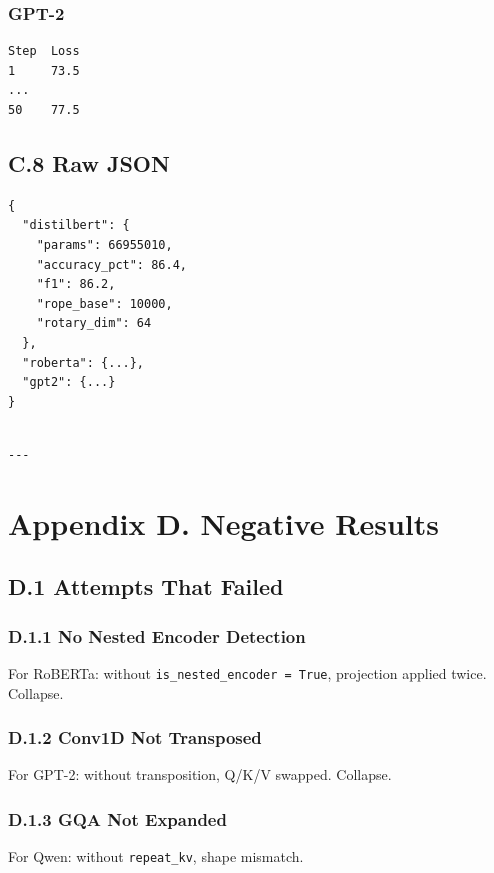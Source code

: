 {\subsubsection{GPT-2}
\begin{lstlisting}
Step  Loss
1     73.5
...
50    77.5
\end{lstlisting}

\subsection{C.8 Raw JSON}

\begin{lstlisting}
{
  "distilbert": {
    "params": 66955010,
    "accuracy_pct": 86.4,
    "f1": 86.2,
    "rope_base": 10000,
    "rotary_dim": 64
  },
  "roberta": {...},
  "gpt2": {...}
}
\end{lstlisting}
\begin{lstlisting}

---
\end{lstlisting}


\section{Appendix D. Negative Results}

\subsection{D.1 Attempts That Failed}

\subsubsection{D.1.1 No Nested Encoder Detection}

For RoBERTa: without \texttt{is\_nested\_encoder = True}, projection applied twice. 
Collapse.

\subsubsection{D.1.2 Conv1D Not Transposed}

For GPT-2: without transposition, Q/K/V swapped. Collapse.

\subsubsection{D.1.3 GQA Not Expanded}

For Qwen: without \texttt{repeat\_kv}, shape mismatch.

}
